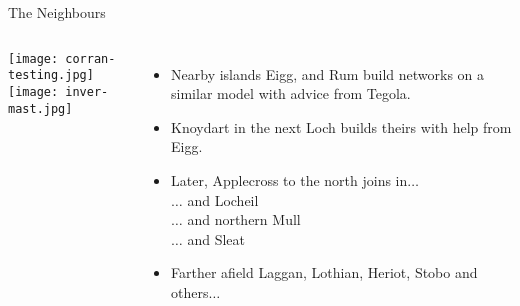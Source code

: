 \documentclass{beamer}
\begin{document}
\begin{frame}{The Neighbours}
  \begin{columns}
    \texttt{[image: corran-testing.jpg]}\\
    \texttt{[image: inver-mast.jpg]}\\
    \begin{itemize}
      \item Nearby islands \alert{Eigg}, and \alert{Rum} build
        networks on a similar model with advice from Tegola.
      \item \alert{Knoydart} in the next Loch builds theirs with help
        from Eigg.
      \item Later, \alert{Applecross} to the north joins in$\ldots$\\
        $\ldots$ and \alert{Locheil}\\
        $\ldots$ and northern \alert{Mull}\\
        $\ldots$ and \alert{Sleat}
      \item Farther afield \alert{Laggan}, \alert{Lothian},
        \alert{Heriot}, \alert {Stobo} and
        others$\ldots$
    \end{itemize}
  \end{columns}
\end{frame}
\end{document}

